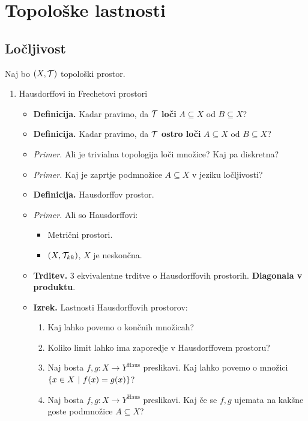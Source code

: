 \section{Topološke lastnosti}

\subsection{Ločljivost}
Naj bo $(X, \mathcal{T})$ topološki prostor.
\begin{enumerate}
    \item Hausdorffovi in Frechetovi prostori
    \begin{itemize}
        \item \colorbox{purple!30}{\textbf{Definicija.}} Kadar pravimo, da $\mathcal{T}$ \textbf{loči} $A \subseteq X$ od $B \subseteq X$?
        \item \colorbox{purple!30}{\textbf{Definicija.}} Kadar pravimo, da $\mathcal{T}$ \textbf{ostro loči} $A \subseteq X$ od $B \subseteq X$?
        \item \colorbox{yellow!30}{\emph{Primer.}} Ali je trivialna topologija loči množice? Kaj pa diskretna?
        \item \colorbox{yellow!30}{\emph{Primer.}} Kaj je zaprtje podmnožice $A \subseteq X$ v jeziku ločljivosti?
        \item \colorbox{purple!30}{\textbf{Definicija.}} Hausdorffov prostor.
        \item \colorbox{yellow!30}{\emph{Primer.}} Ali so Hausdorffovi:
        \begin{itemize}
            \item Metrični prostori.
            \item $(X, \mathcal{T}_{kk})$, $X$ je neskončna.
        \end{itemize}
        \item \colorbox{blue!30}{\textbf{Trditev.}} 3 ekvivalentne trditve o Hausdorffovih prostorih. \textbf{Diagonala v produktu}.
        \item \colorbox{blue!30}{\textbf{Izrek.}} Lastnosti Hausdorffovih prostorov:
        \begin{enumerate}
            \item Kaj lahko povemo o končnih množicah?
            \item Koliko limit lahko ima zaporedje v Hausdorffovem prostoru?
            \item Naj bosta $f,g: X \to Y^\text{Haus}$ preslikavi. Kaj lahko povemo o množici $\left\{x \in X \ | \ f(x) = g(x)\right\}$?
            \item Naj bosta $f,g: X \to Y^\text{Haus}$ preslikavi. Kaj če se $f, g$ ujemata na kakšne goste podmnožice $A \subseteq X$?

\end{enumerate}
\end{itemize}
\end{enumerate}
